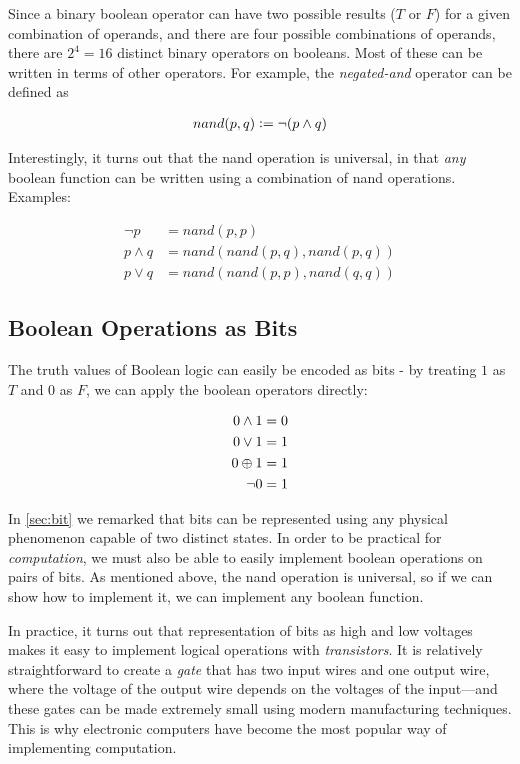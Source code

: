 Since a binary boolean operator can have two possible results ($T$ or
$F$) for a given combination of operands, and there are four possible
combinations of operands, there are $2^{4}=16$ distinct binary
operators on booleans.  Most of these can be written in terms of other
operators.  For example, the \emph{negated-and} operator can be defined as

\begin{align}
  nand(p,q) \vcentcolon= \neg (p \land q)
\end{align}

Interestingly, it turns out that the nand operation is universal, in
that \emph{any} boolean function can be written using a combination of
nand operations.  Examples:

\begin{align}
  \neg p &= nand(p,p) \\
  p \land q &= nand(nand(p,q),nand(p,q)) \\
  p \lor q &= nand(nand(p,p),nand(q,q))
\end{align}

\subsection{Boolean Operations as Bits}

The truth values of Boolean logic can easily be encoded as bits - by
treating $1$ as $T$ and $0$ as $F$, we can apply the boolean operators
directly:

\begin{align}
  0 \land 1 &= 0 \\
  0 \lor 1 &= 1 \\
  0 \oplus 1 &= 1 \\
  \neg 0 &= 1
\end{align}

In \cref{sec:bit} we remarked that bits can be represented using any
physical phenomenon capable of two distinct states.  In order to be
practical for \emph{computation}, we must also be able to easily
implement boolean operations on pairs of bits.  As mentioned above,
the nand operation is universal, so if we can show how to implement
it, we can implement any boolean function.

In practice, it turns out that representation of bits as high and low
voltages makes it easy to implement logical operations with
\emph{transistors}.  It is relatively straightforward to create a
\emph{gate} that has two input wires and one output wire, where the
voltage of the output wire depends on the voltages of the input---and
these gates can be made extremely small using modern manufacturing
techniques.  This is why electronic computers have become the most
popular way of implementing computation.

